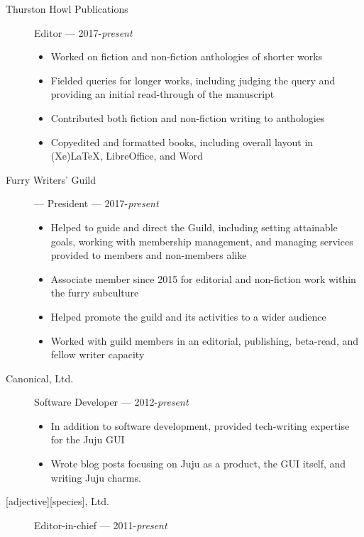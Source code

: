 \begin{description}
\item[Thurston Howl Publications]
Editor --- 2017-\emph{present}

\begin{itemize}
\tightlist
\item
  Worked on fiction and non-fiction anthologies of shorter works
\item
  Fielded queries for longer works, including judging the query and
  providing an initial read-through of the manuscript
\item
  Contributed both fiction and non-fiction writing to anthologies
\item
  Copyedited and formatted books, including overall layout in (Xe)LaTeX, LibreOffice, and Word
\end{itemize}
\item[Furry Writers' Guild] --- President --- 2017-\emph{present}

\begin{itemize}
  \item Helped to guide and direct the Guild, including setting attainable goals, working with membership management, and managing services provided to members and non-members alike
  \item Associate member since 2015 for editorial and non-fiction work within the furry subculture
  \item Helped promote the guild and its activities to a wider audience
  \item Worked with guild members in an editorial, publishing, beta-read, and fellow writer capacity
\end{itemize}
\item[Canonical, Ltd.]
Software Developer --- 2012-\emph{present}

\begin{itemize}
\tightlist
\item
  In addition to software development, provided tech-writing expertise
  for the Juju GUI
\item
  Wrote blog posts focusing on Juju as a product, the GUI itself, and
  writing Juju charms.
\end{itemize}
\item[{[}adjective{]}{[}species{]}, Ltd.]
Editor-in-chief --- 2011-\emph{present}


\end{description}
